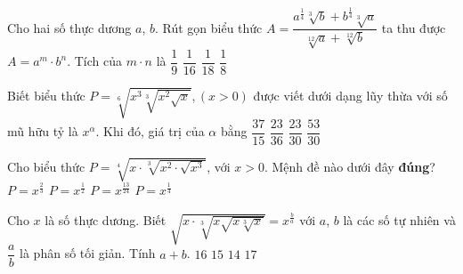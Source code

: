 \begin{ex}%
	Cho hai số thực dương $a$, $b$. Rút gọn biểu thức $A=\dfrac{a^{\tfrac{1}{4}}\sqrt[3]{b}+b^{\tfrac{1}{4}}\sqrt[3]{a}}{\sqrt[12]a+\sqrt[12]b}$ ta thu được $A=a^m\cdot b^n$. Tích của $m\cdot  n$ là
	\choice 
		 {$\dfrac{1}{9}$}
		{\True $\dfrac{1}{16}$} 
		{$\dfrac{1}{18}$} 
		{$\dfrac{1}{8}$} 
\end{ex}

\begin{ex}%
	Biết  biểu thức $P=\sqrt[6]{x^3\sqrt[3]{x^2\sqrt{x}}}, \left(x>0\right)$ được viết dưới dạng lũy thừa với số mũ hữu tỷ là $x^{\alpha}$. Khi đó, giá trị của $\alpha $ bằng
	 \choice
		 {$\dfrac{37}{15}$}
		 {\True $\dfrac{23}{36}$}
		{$\dfrac{23}{30}$} 
		 {$\dfrac{53}{30}$}
\end{ex}

\begin{ex}%
	[Mã 102 2017] Cho biểu  thức $P=\sqrt[4]{x\cdot \sqrt[3]{x^2\cdot \sqrt{x^3}}}$, với $x>0$. Mệnh đề nào dưới đây \textbf{đúng}?
	 \choice
		 {$P=x^{\frac{2}{3}}$}
		{$P=x^{\frac{1}{2}}$} 
		{\True  $P=x^{\frac{13}{24}}$}
		{$P=x^{\frac{1}{4}}$} 
\end{ex}

\begin{ex}%
	Cho $x$ là số thực dương. Biết  $\sqrt{x\cdot \sqrt[3]{x\sqrt{x\sqrt[3]{x}}}}=x^{\tfrac{b}{a}}$ với $a$, $b$ là các số tự nhiên và $\dfrac{a}{b}$ là phân số tối giản. Tính $a+b$.
	 \choice
		{\True $16$} 
		{$15$} 
		 {$14$}
		 {$17$}
\end{ex}

